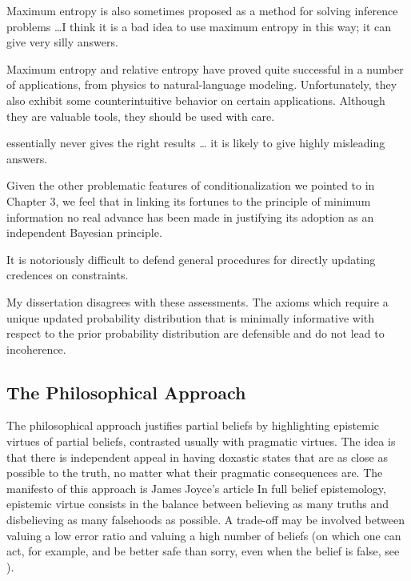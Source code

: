 \documentclass[phd,12pt,oneside]{ubcthesis}
\begin{document}
\begin{quotex}
  Maximum entropy is also sometimes proposed as a method for solving
  inference problems \ldots I think it is a bad idea to use maximum
  entropy in this way; it can give very silly answers.
\end{quotex}

\begin{quotex}
  Maximum entropy and relative entropy have proved quite successful in
  a number of applications, from physics to natural-language modeling.
  Unfortunately, they also exhibit some counterintuitive behavior on
  certain applications. Although they are valuable tools, they should
  be used with care. 
\end{quotex}

\begin{quotex}
   essentially never gives the right results {\ldots} it
  is likely to give highly misleading answers.
\end{quotex}

\begin{quotex}
  Given the other problematic features of conditionalization we
  pointed to in Chapter 3, we feel that in linking its fortunes to the
  principle of minimum information no real advance has been made in
  justifying its adoption as an independent Bayesian principle.
\end{quotex}

\begin{quotex}
  It is notoriously difficult to defend general procedures for
  directly updating credences on constraints. 
\end{quotex}

My dissertation disagrees with these assessments. The axioms which
require a unique updated probability distribution that is minimally
informative with respect to the prior probability distribution are
defensible and do not lead to incoherence.

\subsection{The Philosophical Approach}
\label{subsec:upuxaith}

The philosophical approach justifies partial beliefs by highlighting
epistemic virtues of partial beliefs, contrasted usually with
pragmatic virtues. The idea is that there is independent appeal in
having doxastic states that are as close as possible to the truth, no
matter what their pragmatic consequences are. The manifesto of this
approach is James Joyce's article  In full belief epistemology, epistemic virtue consists
in the balance between believing as many truths and disbelieving as
many falsehoods as possible. A trade-off may be involved between
valuing a low error ratio and valuing a high number of beliefs (on
which one can act, for example, and be better safe than sorry, even
when the belief is false, see ). 
\end{document}

